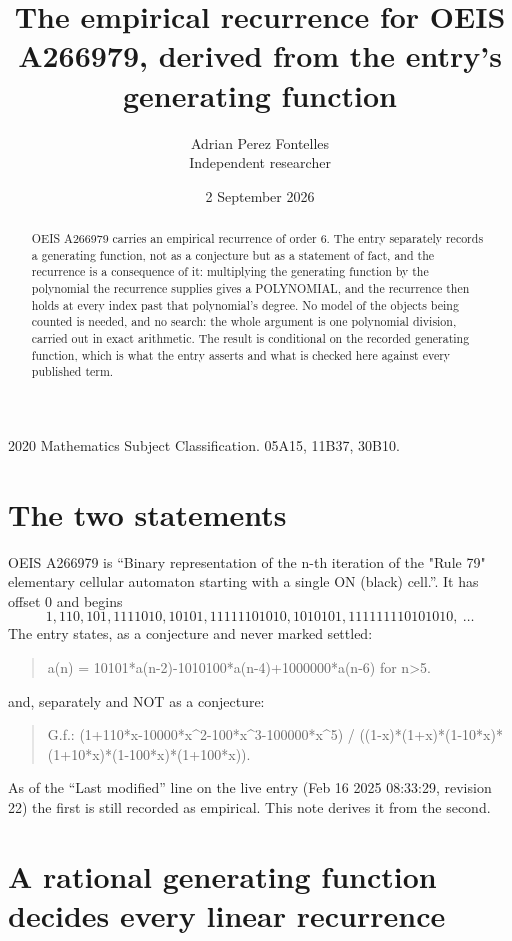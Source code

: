 \documentclass[11pt,a4paper]{article}
\title{The empirical recurrence for OEIS A266979, derived from the entry's generating function}
\author{Adrian Perez Fontelles\\ \small Independent researcher}
\date{2 September 2026}
\theoremstyle{plain}
\theoremstyle{definition}
\begin{document}
\maketitle

\begin{abstract}
OEIS A266979 carries an empirical recurrence of order $6$. The entry separately records a
generating function, not as a conjecture but as a statement of fact, and the recurrence is a
consequence of it: multiplying the generating function by the polynomial the recurrence
supplies gives a POLYNOMIAL, and the recurrence then holds at every index past that
polynomial's degree. No model of the objects being counted is needed, and no search: the
whole argument is one polynomial division, carried out in exact arithmetic. The result is
conditional on the recorded generating function, which is what the entry asserts and what is
checked here against every published term.
\end{abstract}

\noindent\small 2020 Mathematics Subject Classification. 05A15, 11B37, 30B10.\normalsize

\section{The two statements}

OEIS A266979 is ``Binary representation of the n-th iteration of the "Rule 79" elementary cellular automaton starting with a single ON (black) cell.''. It has offset $0$ and begins
\[
1, 110, 101, 1111010, 10101, 11111101010, 1010101, 111111110101010,\ \dots
\]
The entry states, as a conjecture and never marked settled:
\begin{quote}
a(n) = 10101*a(n-2)-1010100*a(n-4)+1000000*a(n-6) for n>5.
\end{quote}
and, separately and NOT as a conjecture:
\begin{quote}
G.f.: (1+110*x-10000*x\^{}2-100*x\^{}3-100000*x\^{}5) / ((1-x)*(1+x)*(1-10*x)*(1+10*x)*(1-100*x)*(1+100*x)).
\end{quote}
As of the ``Last modified'' line on the live entry (Feb 16 2025 08:33:29, revision 22) the first is still
recorded as empirical. This note derives it from the second.

\section{A rational generating function decides every linear recurrence}
\end{document}
